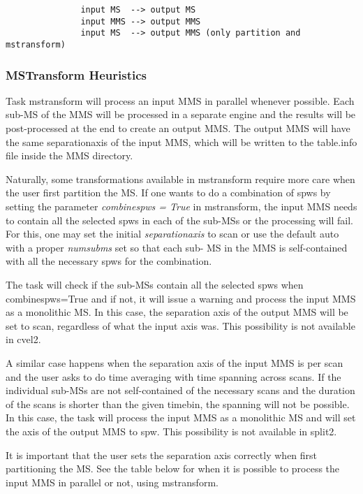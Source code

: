 \begin{verbatim}
               input MS  --> output MS
               input MMS --> output MMS
               input MS  --> output MMS (only partition and mstransform)
\end{verbatim}

\subsubsection{MSTransform Heuristics}
Task mstransform will process an input MMS in parallel whenever possible. Each sub-MS of
the MMS will be processed in a separate engine and the results will be post-processed at the
end to create an output MMS. The output MMS will have the same separationaxis of the input
MMS, which will be written to the table.info file inside the MMS directory.

Naturally, some transformations available in mstransform require more care when the user
first partition the MS. If one wants to do a combination of spws by setting the parameter
{\it combinespws = True} in mstransform, the input MMS needs to contain all the
selected spws in each of the sub-MSs or the processing will fail. For this, one may set the initial
{\it separationaxis} to scan or use the default auto with a proper {\it
numsubms} set so that each sub- MS in the MMS is self-contained with all the necessary spws for the combination.

The task will check if the sub-MSs contain all the selected spws when combinespws=True
and if not, it will issue a warning and process the input MMS as a monolithic MS. In this
case, the separation axis of the output MMS will be set to scan, regardless of what the input
axis was. This possibility is not available in cvel2.

A similar case happens when the separation axis of the input MMS is per scan and the user
asks to do time averaging with time spanning across scans. If the individual sub-MSs are not
self-contained of the necessary scans and the duration of the scans is shorter than the given
timebin, the spanning will not be possible. In this case, the task will process the input MMS as
a monolithic MS and will set the axis of the output MMS to spw. This possibility is not
available in split2.

It is important that the user sets the separation axis correctly when first partitioning the MS.
See the table below for when it is possible to process the input MMS in parallel or not, using
mstransform.

